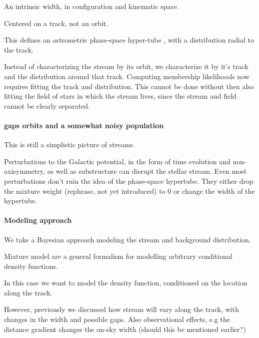 \documentclass[twocolumn]{aastex631}
\begin{document}
            An intrinsic width, in configuration and kinematic space.

            Centered on a track, not an orbit.

            This defines an astrometric phase-space hyper-tube \cite{2018MNRAS.477.4063M}, with a distribution radial to the track.

            Instead of characterizing the stream by its orbit, we characterize it by it's track and the distribution around that track.
            Computing membership likelihoods now requires fitting the track and distribution. This cannot be
            done without then also fitting the field of stars in which the stream lives, since the stream 
            and field cannot be clearly separated.

        \paragraph{gaps orbits and a somewhat noisy population}

            This is still a simplistic picture of streams.

            Perturbations to the Galactic potential, in the form of time evolution and non-axisymmetry, as well as substructure can disrupt the stellar stream. 
            Even most perturbations don't ruin the idea of the phase-space hypertube. They either drop the mixture weight (rephrase, not yet introduced) to 0 or change the width of the hypertube.


        \paragraph{Modeling approach}

            We take a Bayesian approach modeling the stream and background distribution.
            
            Mixture model are a general formalism for modelling arbitrary conditional density functions.
            
            In this case we want to model the density function, conditioned on the location along the track.

            However, previously we discussed how stream will vary along the track, with changes in the width and possible gaps.
            Also observational effects, e.g the distance gradient changes the on-sky width (should this be mentioned earlier?)
\end{document}

